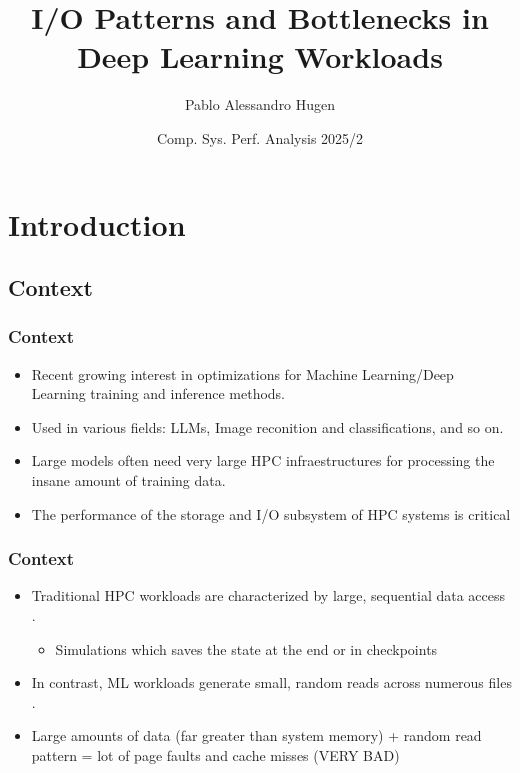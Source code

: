 \documentclass[brazil, bsc, 10pt]{beamer}
\title[Intro]{I/O Patterns and Bottlenecks in Deep Learning Workloads}
\author[Hugen]{
  Pablo Alessandro Hugen\inst{1}
}
\institute[UFRGS]{
  \inst{1}%
  Institute of Informatics -- UFRGS\\
}
\date[2024]{
  Comp. Sys. Perf. Analysis 2025/2
}
\begin{document}
\frame{\titlepage}
\logo{}

\section{Introduction}

\subsection{Context}

\begin{frame}
	\frametitle{Context}

	\begin{block}{}
		\begin{itemize}
			\item Recent growing interest in optimizations for Machine Learning/Deep Learning
			      training and inference methods.
			\item Used in various fields: LLMs, Image reconition and classifications, and so on.
			\item Large models often need very large HPC infraestructures for
			      processing the insane amount of training data.
			\item The performance of the storage and I/O subsystem of HPC systems is critical

		\end{itemize}
	\end{block}
\end{frame}

\begin{frame}
	\frametitle{Context}

	\begin{block}{}
		\begin{itemize}
			\item Traditional HPC workloads are characterized by large, sequential data access \cite{characterizing_ml_io_workloads}.
			      \begin{itemize}
				      \item Simulations which saves the state at the end or in checkpoints
			      \end{itemize}

			\item In contrast, ML workloads generate small, random reads across numerous files \cite{characterizing_ml_io_workloads}.

			\item Large amounts of data (far greater than system memory) + random read pattern = lot of page faults and cache misses (VERY BAD)
		\end{itemize}
	\end{block}
\end{frame}
\end{document}
